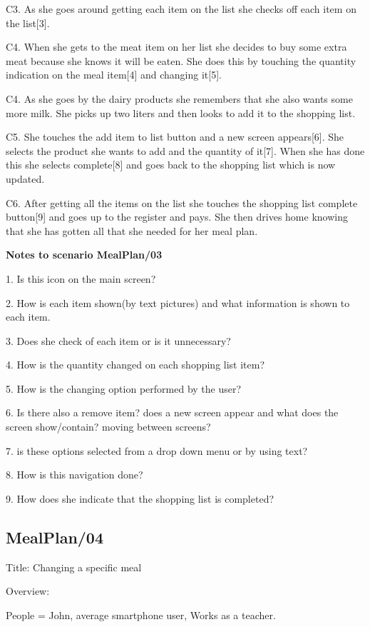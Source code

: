 	C3. As she goes around getting each item on the list she checks off each item on the list[3].
	
	C4. When she gets to the meat item on her list she decides to buy some extra meat because she knows it will be eaten. She does this by touching the quantity indication on the meal item[4] and changing it[5]. 	
	
	C4. As she goes by the dairy products she remembers that she also wants some more milk. She picks up two liters and then looks to add it to the shopping list.
	
	C5. She touches the add item to list button and a new screen appears[6]. She selects the product she wants to add and the quantity of it[7]. When she has done this she selects complete[8] and goes back to the shopping list which is now updated.
	
	C6. After getting all the items on the list she touches the shopping list complete button[9] and goes up to the register and pays. She then drives home knowing that she has gotten all that she needed for her meal plan.    
	
\textbf{Notes to scenario MealPlan/03}

1. Is this icon on the main screen?

2. How is each item shown(by text pictures) and what information is shown to each item.

3. Does she check of each item or is it unnecessary?

4. How is the quantity changed on each shopping list item?  

5. How is the changing option performed by the user?

6. Is there also a remove item? does a new screen appear and what does the screen show/contain? moving between screens?

7. is these options selected from a drop down menu or by using text?

8. How is this navigation done?

9. How does she indicate that the shopping list is completed?

\subsection{MealPlan/04} \label{MealPlan04}

Title: Changing a specific meal

Overview:
	
	People = John, average smartphone user, Works as a teacher.
	
